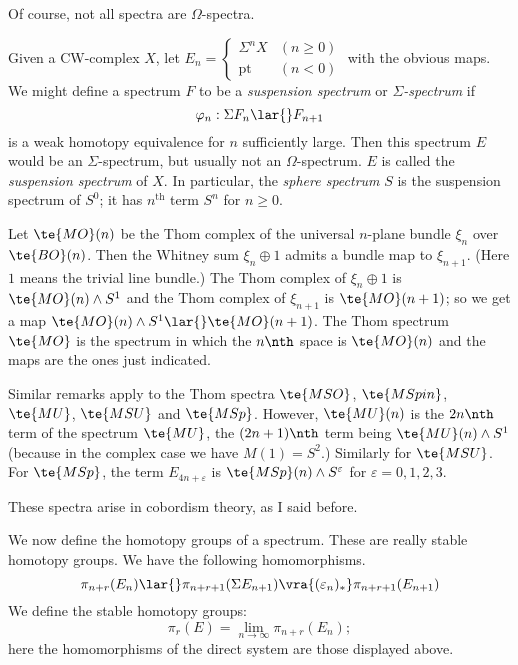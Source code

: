\documentclass[../main]{subfiles}
\begin{document}
Of course, not all spectra are $\Omega$-spectra.

\begin{example} \label{ex:p3ch02.3}
Given a CW-complex $X$, let 
$
E_n
=
\begin{cases}
\Sigma  ^nX        &(n\geq 0) \\
\mathrm{pt} &(n<0)
\end{cases}
$
 with the obvious maps. We might define a spectrum $F$ to be a \emph{suspension spectrum} or \emph{$\Sigma$-spectrum} if
\[
\varphi_n: \Sigma   F_n \lar{} F_{n+1}
\]
is a weak homotopy equivalence for $n$ sufficiently large. Then this spectrum $E$ would be an $\Sigma$-spectrum, but usually not an $\Omega$-spectrum. $E$ is called the \emph{suspension spectrum} of $X$. In particular, the \emph{sphere spectrum} $S$ is the suspension spectrum of $S^0$; it has $n^{\text{th}}$ term $S^n$ for $n\geq 0$.
\end{example}

\begin{example} \label{ex:p3ch02.4}
Let $\te{MO}(n)$ be the Thom complex of the universal $n$-plane bundle $\xi_n$ over $\te{BO}(n)$. Then the Whitney sum $\xi_n \oplus 1$ admits a bundle map to $\xi_{n+1}$. (Here $1$ means the trivial line bundle.) The Thom complex of $\xi_n \oplus 1$ is $\te{MO}(n) \wedge S^1$ and the Thom complex of $\xi_{n+1}$ is $\te{MO}(n+1)$; so we get a map $\te{MO}(n)\wedge S^1 \lar{} \te{MO}(n+1)$. The Thom spectrum $\te{MO}$ is the spectrum in which the $n\nth$ space is $\te{MO}(n)$ and the maps are the ones just indicated. 

Similar remarks apply to the Thom spectra $\te{MSO}$, $\te{MSpin}$, $\te{MU}$, $\te{MSU}$ and $\te{MSp}$. However, $\te{MU}(n)$ is the $2n\nth$ term of the spectrum $\te{MU}$, the $(2n+1)\nth$ term being $\te{MU}(n)\wedge S^1$ (because in the complex case we have $M(1)=S^2$.) Similarly for $\te{MSU}$. For $\te{MSp}$, the term $E_{4n+\varepsilon}$ is $\te{MSp}(n)\wedge S^\varepsilon$ for $\varepsilon=0,1,2,3$. 
\end{example}

These spectra arise in cobordism theory, as I said before.

We now define the homotopy groups of a spectrum. These are really stable homotopy groups. We have the following homomorphisms.
\[
\pi_{n+r}(E_n)
\lar{}
\pi_{n+r+1}(\Sigma   E_{n+1})
\vra{(\varepsilon_n)_\ast}
\pi_{n+r+1}(E_{n+1})
\]
We define the stable homotopy groups: 
\[
\pi_r(E) = \lim_{n\to \infty} \pi_{n+r}(E_n);
\]
here the homomorphisms of the direct system are those displayed above.
\end{document}
